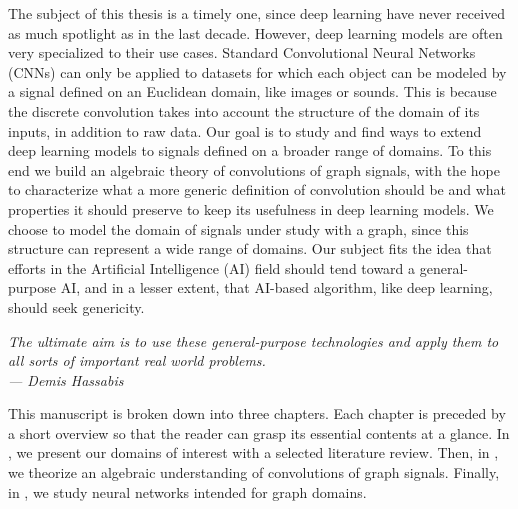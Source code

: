 The subject of this thesis is a timely one, since deep learning have never received as much spotlight as in the last decade. However, deep learning models are often very specialized to their use cases. Standard Convolutional Neural Networks (CNNs) can only be applied to datasets for which each object can be modeled by a signal defined on an Euclidean domain, like images or sounds. This is because the discrete convolution takes into account the structure of the domain of its inputs, in addition to raw data. Our goal is to study and find ways to extend deep learning models to signals defined on a broader range of domains. To this end we build an algebraic theory of convolutions of graph signals, with the hope to characterize what a more generic definition of convolution should be and what properties it should preserve to keep its usefulness in deep learning models. We choose to model the domain of signals under study with a graph, since this structure can represent a wide range of domains. Our subject fits the idea that efforts in the Artificial Intelligence (AI) field should tend toward a general-purpose AI, and in a lesser extent, that AI-based algorithm, like deep learning, should seek genericity.

\begin{displayquote}
\begin{flushright}
\emph{The ultimate aim is to use these general-purpose technologies and apply them to all sorts of important real world problems.\\
--- Demis Hassabis}
\end{flushright}
\end{displayquote}

This manuscript is broken down into three chapters. Each chapter is preceded by a short overview so that the reader can grasp its essential contents at a glance. In , we present our domains of interest with a selected literature review. Then, in , we theorize an algebraic understanding of convolutions of graph signals. Finally, in , we study neural networks intended for graph domains.


